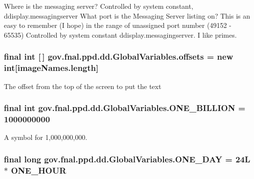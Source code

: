 Where is the messaging server? Controlled by system constant, ddisplay.\-messagingserver What port is the Messaging Server listing on? This is an easy to remember (I hope) in the range of unassigned port number (49152 -\/ 65535) Controlled by system constant ddisplay.\-messagingserver. I like primes. \hypertarget{classgov_1_1fnal_1_1ppd_1_1dd_1_1GlobalVariables_aa46c72aaa61e4f90401679376f6071f5}{
\subsubsection[{offsets}]{\setlength{\rightskip}{0pt plus 5cm}final int \mbox{[}$\,$\mbox{]} gov.\-fnal.\-ppd.\-dd.\-Global\-Variables.\-offsets = new int\mbox{[}image\-Names.\-length\mbox{]}\hspace{0.3cm}{\ttfamily [static]}}}\label{classgov_1_1fnal_1_1ppd_1_1dd_1_1GlobalVariables_aa46c72aaa61e4f90401679376f6071f5}
The offset from the top of the screen to put the text \hypertarget{classgov_1_1fnal_1_1ppd_1_1dd_1_1GlobalVariables_a271c983add4bac415412025c8ac2f4cc}{
\subsubsection[{O\-N\-E\-\_\-\-B\-I\-L\-L\-I\-O\-N}]{\setlength{\rightskip}{0pt plus 5cm}final int gov.\-fnal.\-ppd.\-dd.\-Global\-Variables.\-O\-N\-E\-\_\-\-B\-I\-L\-L\-I\-O\-N = 1000000000\hspace{0.3cm}{\ttfamily [static]}}}\label{classgov_1_1fnal_1_1ppd_1_1dd_1_1GlobalVariables_a271c983add4bac415412025c8ac2f4cc}
A symbol for 1,000,000,000. \hypertarget{classgov_1_1fnal_1_1ppd_1_1dd_1_1GlobalVariables_aef5cbdf53c9830ae609987b805a08998}{
\subsubsection[{O\-N\-E\-\_\-\-D\-A\-Y}]{\setlength{\rightskip}{0pt plus 5cm}final long gov.\-fnal.\-ppd.\-dd.\-Global\-Variables.\-O\-N\-E\-\_\-\-D\-A\-Y = 24\-L $\ast$ O\-N\-E\-\_\-\-H\-O\-U\-R\hspace{0.3cm}{\ttfamily [static]}}}\label{classgov_1_1fnal_1_1ppd_1_1dd_1_1GlobalVariables_aef5cbdf53c9830ae609987b805a08998}
